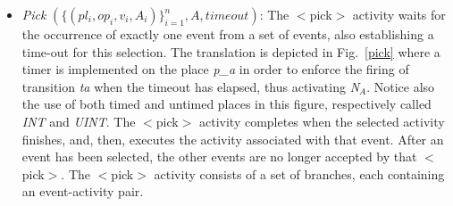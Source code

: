 \begin{itemize}
\item {\it Pick} $(\{(pl_i,op_i,v_i,A_i)\}_{i=1}^n,A,timeout)$: The $<$pick$>$ activity waits for the occurrence of exactly one event from a set of events, also establishing a
time-out for this selection. The translation is depicted in Fig.~\ref{pick} where a timer is implemented on the place {\it p\_a} in order to enforce the firing of transition {\it ta} when the timeout has elapsed, thus activating {\it N$_{A}$}. Notice also the use of both timed and untimed places in this figure, respectively called {\it INT} and {\it UINT}.  The $<$pick$>$ activity completes when the selected activity finishes, and, then, executes the activity associated with that event. After an event has been selected, the other events 
are no longer accepted by that $<$pick$>$. The $<$pick$>$ activity consists of a set of branches, each containing an event-activity pair.  



\end{itemize}
